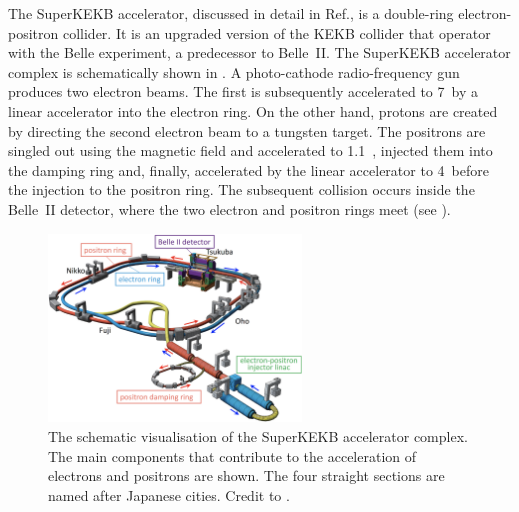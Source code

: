 The SuperKEKB accelerator, discussed in detail in Ref.\cite{Akai:2018mbz}, is a double-ring electron-positron collider.
It is an upgraded version of the KEKB collider \cite{Oide:2009zz} that operator with the Belle experiment, a predecessor to Belle~II.
The SuperKEKB accelerator complex is schematically shown in .
A photo-cathode radio-frequency gun produces two electron beams.
The first is subsequently accelerated to 7~\gev by a linear accelerator into the electron ring.
On the other hand, protons are created by directing the second electron beam to a tungsten target.
The positrons are singled out using the magnetic field and accelerated to 1.1~\gev, injected them into the damping ring and, finally,
accelerated by the linear accelerator to 4~\gev before the injection to the positron ring.
The subsequent collision occurs inside the Belle~II detector, where the two electron and positron rings meet (see ).
\begin{figure}[htbp!]
    \centering
    \includegraphics[width=0.6\textwidth]{figures/experimental_setup/super_kekb.png}
    \caption{\label{fig:superkekb}
        The schematic visualisation of the SuperKEKB accelerator complex.
        The main components that contribute to the acceleration of electrons and positrons are shown.
        The four straight sections are named after Japanese cities.
        Credit to \cite{Akai:2018mbz}.
    }
\end{figure}

